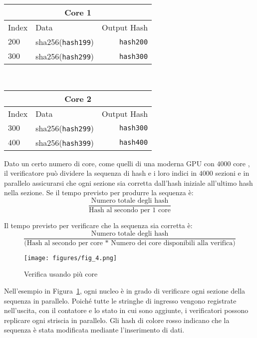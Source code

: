 \documentclass[12pt]{article}
\begin{document}
\begin{center}

\begin{tabular}{l l r}
    \multicolumn{3}{c}{Core 1} \\ \hline
    Index & Data & Output Hash \\ \hline
    $200$ & sha256(\texttt{hash199}) & \texttt{hash200} \\
    $300$ & sha256(\texttt{hash299}) & \texttt{hash300}\\
    \end{tabular}\\

  \begin{tabular}{l l r}
    \multicolumn{3}{c}{Core 2} \\
    \hline
    Index & Data & Output Hash \\ \hline
    $300$ & sha256(\texttt{hash299}) & \texttt{hash300} \\
    $400$ & sha256(\texttt{hash399}) & \texttt{hash400}\\
    \end{tabular}

\end{center}


Dato un certo numero di core, come quelli di una moderna GPU con $4000$ core , il verificatore può dividere la sequenza di hash e i loro indici in $4000$ sezioni  e in parallelo assicurarsi che ogni sezione sia corretta dall'hash iniziale all'ultimo hash nella sezione. Se il tempo previsto per produrre la sequenza è:\\


\[
\frac{\textrm{Numero totale degli hash}}{\textrm{Hash al secondo per 1 core}}
\]

\noindent Il tempo previsto per verificare che la sequenza sia corretta è:\\

\[
\frac{\textrm{Numero totale degli hash}}{\textrm{(Hash al secondo per core * Numero dei core disponibili alla verifica)}}
\]

\begin{figure}
  \begin{center}
    \centering
    \texttt{[image: figures/fig\_4.png]}
    \caption[Figure 4]{Verifica usando più core\label{fig:poh_verify}}
  \end{center}
  \end{figure}

Nell'esempio in Figura~\ref{fig:poh_verify}, ogni nucleo è in grado di verificare ogni sezione della sequenza in parallelo. Poiché tutte le stringhe di ingresso vengono registrate nell'uscita, con il contatore e lo stato in cui sono aggiunte, i verificatori possono replicare ogni striscia in parallelo. Gli hash di colore rosso indicano che la sequenza è stata modificata mediante l'inserimento di dati.
\end{document}
